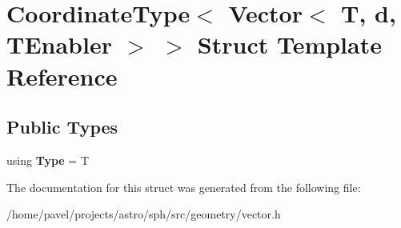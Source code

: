 \hypertarget{structCoordinateType_3_01Vector_3_01T_00_01d_00_01TEnabler_01_4_01_4}{}\section{Coordinate\+Type$<$ Vector$<$ T, d, T\+Enabler $>$ $>$ Struct Template Reference}
\label{structCoordinateType_3_01Vector_3_01T_00_01d_00_01TEnabler_01_4_01_4}
\subsection*{Public Types}
\begin{DoxyCompactItemize}
\item 
\hypertarget{structCoordinateType_3_01Vector_3_01T_00_01d_00_01TEnabler_01_4_01_4_a5e8125dc2efa710e3fd7b359e282963c}{}\label{structCoordinateType_3_01Vector_3_01T_00_01d_00_01TEnabler_01_4_01_4_a5e8125dc2efa710e3fd7b359e282963c} 
using {\bfseries Type} = T
\end{DoxyCompactItemize}


The documentation for this struct was generated from the following file\+:\begin{DoxyCompactItemize}
\item 
/home/pavel/projects/astro/sph/src/geometry/vector.\+h\end{DoxyCompactItemize}

